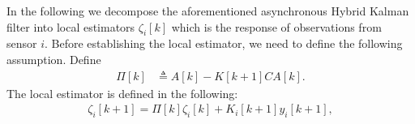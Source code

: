 \documentclass[12pt]{article}
\newcommand{\Rb}{{\mathbb{R}}}
\newtheorem{assumption}{\textbf{Assumption}}
\begin{document}
In the following we decompose the aforementioned asynchronous Hybrid Kalman filter into local estimators $\zeta_i[k]$ which is the response of observations from sensor $i$.
%
%
%
Before establishing the local estimator, we need to define the following assumption.
Define
\begin{align*}
\Pi[k] &\triangleq A[k]-K[k+1]C A[k] .
\end{align*}
The local estimator is defined in the following:
\begin{align}\label{eq:def_zeta}
	\zeta_{i}[k+1]=\Pi[k] \zeta_{i}[k] + K_i[k+1] y_i[k+1],
\end{align}
\end{document}
